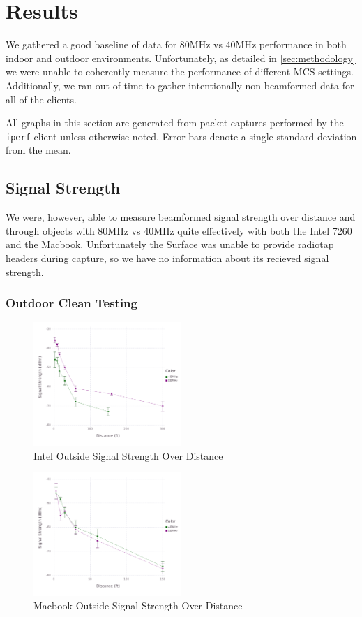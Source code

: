 \section{Results}
We gathered a good baseline of data for 80MHz vs 40MHz performance in
both indoor and outdoor environments. Unfortunately, as detailed in
\ref{sec:methodology} we were unable to coherently measure the
performance of different MCS settings. Additionally, we ran out of
time to gather intentionally non-beamformed data for all of the
clients. 

All graphs in this section are generated from packet captures
performed by the \texttt{iperf} client unless otherwise noted. Error
bars denote a single standard deviation from the mean.

\subsection{Signal Strength}
We were, however, able to measure beamformed signal strength over
distance and through objects with 80MHz vs 40MHz quite effectively
with both the Intel 7260 and the Macbook. Unfortunately the Surface
was unable to provide radiotap headers during capture, so we have no
information about its recieved signal strength.

\subsubsection{Outdoor Clean Testing}

\begin{figure}[!h]
\centering
\includegraphics[width=0.5\textwidth]{figures/Intel_Outside_Beamformed}
\caption{Intel Outside Signal Strength Over Distance}
\label{fig:inteloutsidesignal}
\end{figure}

\begin{figure}[!h]
\centering
\includegraphics[width=0.5\textwidth]{figures/Mac_Outside_Beamformed}
\caption{Macbook Outside Signal Strength Over Distance}
\label{fig:macoutsidesignal}
\end{figure}


